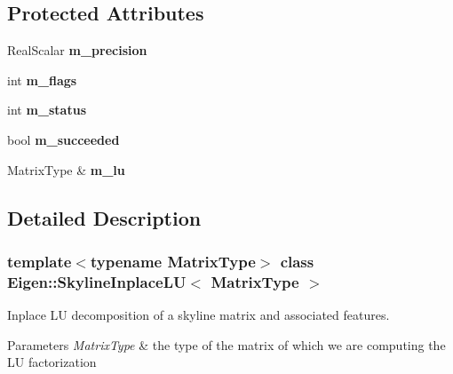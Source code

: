 \subsection*{Protected Attributes}
\begin{DoxyCompactItemize}
\item 
\mbox{\label{class_eigen_1_1_skyline_inplace_l_u_a7b138817409be072da8e038e90f660f8}} 
Real\+Scalar {\bfseries m\+\_\+precision}
\item 
\mbox{\label{class_eigen_1_1_skyline_inplace_l_u_a12a06e21f5d2ca69c29b5a18adce5667}} 
int {\bfseries m\+\_\+flags}
\item 
\mbox{\label{class_eigen_1_1_skyline_inplace_l_u_a7af77a07a77dad5299280984223f38fb}} 
int {\bfseries m\+\_\+status}
\item 
\mbox{\label{class_eigen_1_1_skyline_inplace_l_u_a63b145c975567bf3acf30608a018fbca}} 
bool {\bfseries m\+\_\+succeeded}
\item 
\mbox{\label{class_eigen_1_1_skyline_inplace_l_u_a6cb154ca0789828e2082c2cfcb847811}} 
Matrix\+Type \& {\bfseries m\+\_\+lu}
\end{DoxyCompactItemize}


\subsection{Detailed Description}
\subsubsection*{template$<$typename Matrix\+Type$>$\newline
class Eigen\+::\+Skyline\+Inplace\+L\+U$<$ Matrix\+Type $>$}

Inplace LU decomposition of a skyline matrix and associated features. 


\begin{DoxyParams}{Parameters}
{\em Matrix\+Type} & the type of the matrix of which we are computing the LU factorization \\
\hline
\end{DoxyParams}


